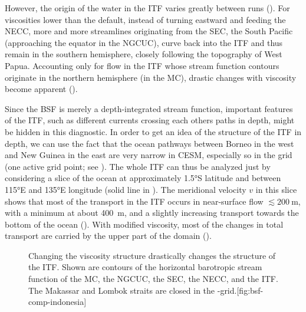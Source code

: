 However, the origin of the water in the \ac{ITF} varies greatly between  runs (). For viscosities lower than the default, instead of turning eastward and feeding the \ac{NECC}, more and more streamlines originating from the \ac{SEC}, \ie the South Pacific (approaching the equator in the \ac{NGCUC}), curve back into the \ac{ITF} and thus remain in the southern hemisphere, closely following the topography of West Papua. Accounting only for flow in the \ac{ITF} whose stream function contours originate in the northern hemisphere (\ie in the \acl{MC}), drastic changes with viscosity become apparent ().

Since the \ac{BSF} is merely a depth-integrated stream function, important features of the \ac{ITF}, such as different currents crossing each others paths in depth, might be hidden in this diagnostic. In order to get an idea of the structure of the \ac{ITF} in depth, we can use the fact that the ocean pathways between Borneo in the west and New Guinea in the east are very narrow in \ac{CESM}, especially so in the  grid (one active grid point; see ). The whole \ac{ITF} can thus be analyzed just by considering a slice of the ocean at approximately \ang{1.5}S latitude and between \ang{115}E and \ang{135}E longitude (solid line in ). The meridional velocity \(v\) in this slice shows that most of the transport in the \ac{ITF} occurs in near-surface flow \(\lesssim \SI{200}{\metre}\), with a minimum at about \SI{400}{\metre}, and a slightly increasing transport towards the bottom of the ocean (). With modified viscosity, most of the changes in total transport are carried by the upper part of the domain ().

\begin{figure}
	\begin{sidecaption}{Changing the viscosity structure drastically changes the structure of the \acl{ITF}. Shown are contours of the horizontal barotropic stream function of the \ac{MC}, the \ac{NGCUC}, the \ac{SEC}, the \ac{NECC}, and the \ac{ITF}. The Makassar and Lombok straits are closed in the -grid.}[fig:bsf-comp-indonesia]
		\antimpjustification
	\end{sidecaption}
\end{figure}

